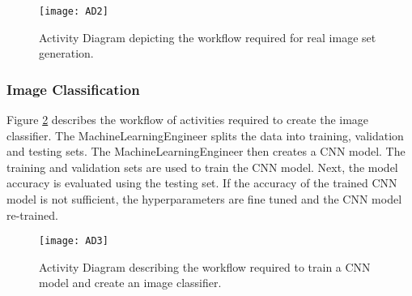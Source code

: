 \begin{figure}[H]
\centering
  \texttt{[image: AD2]}
\caption{Activity Diagram depicting the workflow required for real image set generation.}
\label{fig:AD2}
\end{figure}

\subsubsection{Image Classification}
Figure \ref{fig:AD3} describes the workflow of activities required to create the image classifier. The MachineLearningEngineer splits the data into training, validation and testing sets. The MachineLearningEngineer then creates a CNN model. The training and validation sets are used to train the CNN model. Next, the model accuracy is evaluated using the testing set. If the accuracy of the trained CNN model is not sufficient, the hyperparameters are fine tuned and the CNN model re-trained.

\begin{figure}[H]
\centering
  \texttt{[image: AD3]}
\caption{Activity Diagram describing the workflow required to train a CNN model and create an image classifier.}
\label{fig:AD3}
\end{figure}
